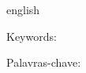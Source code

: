 \setlength{\absparsep}{18pt} 

\begin{resumo}[Abstract]
 \begin{otherlanguage*}{english}

 \end{otherlanguage*}

 Keywords: 
\end{resumo}

\begin{resumo}[Resumo]
    
    Palavras-chave:
\end{resumo}
